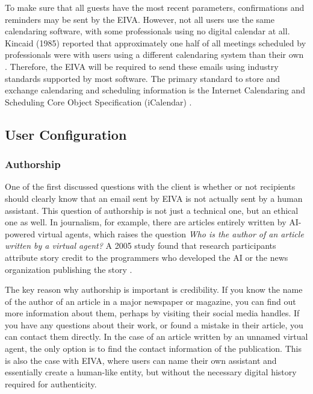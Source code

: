 \documentclass{article}
\begin{document}
To make sure that all guests have the most recent parameters, confirmations and reminders may be sent by the EIVA. However, not all users use the same calendaring software, with some professionals using no digital calendar at all. Kincaid (1985) reported that approximately one half of all meetings scheduled by professionals were with users using a different calendaring system than their own \cite{kincaid_electronic_1985}. Therefore, the EIVA will be required to send these emails using industry standards supported by most software. The primary standard to store and exchange calendaring and scheduling information is the Internet Calendaring and Scheduling Core Object Specification (iCalendar) \cite{desruisseaux_internet_2009}.

\subsection{User Configuration}

\subsubsection{Authorship}

One of the first discussed questions with the client is whether or not recipients should clearly know that an email sent by EIVA is not actually sent by a human assistant. This question of authorship is not just a technical one, but an ethical one as well. In journalism, for example, there are articles entirely written by AI-powered virtual agents, which raises the question \emph{Who is the author of an article written by a virtual agent?} A 2005 study found that research participants attribute story credit to the programmers who developed the AI or the news organization publishing the story \cite{montal_i_2017}.

The key reason why authorship is important is credibility. If you know the name of the author of an article in a major newspaper or magazine, you can find out more information about them, perhaps by visiting their social media handles. If you have any questions about their work, or found a mistake in their article, you can contact them directly. In the case of an article written by an unnamed virtual agent, the only option is to find the contact information of the publication. This is also the case with EIVA, where users can name their own assistant and essentially create a human-like entity, but without the necessary digital history required for authenticity.
\end{document}
